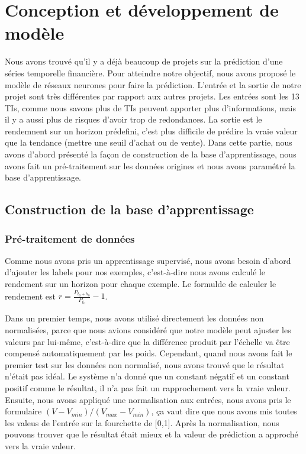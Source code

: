 

\section{Conception et développement de modèle}

Nous avons trouvé qu’il y a déjà beaucoup de projets sur la prédiction d’une séries temporelle financière. Pour atteindre notre objectif, nous avons proposé le modèle de réseaux neurones pour faire la prédiction. L’entrée et la sortie de notre projet sont très différentes par rapport aux autres projets. Les entrées sont les 13 TIs, comme nous savons plus de TIs peuvent apporter plus d’informations, mais il y a aussi plus de risques d’avoir trop de redondances. La sortie est le rendemnent sur un horizon prédefini, c’est plus difficile de prédire la vraie valeur que la tendance (mettre une seuil d’achat ou de vente). Dans cette partie, nous avons d'abord présenté la façon de construction de la base d'apprentissage, nous avons fait un pré-traitement sur les données origines et nous avons paramétré la base d'apprentissage. 

\subsection{Construction de la base d’apprentissage}

\subsubsection{Pré-traitement de données}

Comme nous avons pris un apprentissage supervisé, nous avons besoin d’abord d’ajouter les labels pour nos exemples, c’est-à-dire nous avons calculé le rendement sur un horizon pour chaque exemple. Le formulde de calculer le rendement est $ r = \frac{P_{t_{0}+h_{0}}}{P_{t_{0}}} - 1 $.

Dans un premier temps, nous avons utilisé directement les données non normalisées, parce que nous avions considéré que notre modèle peut ajuster les valeurs par lui-même, c'est-à-dire que la différence produit par l'échelle va être compensé automatiquement par les poids. Cependant, quand nous avons fait le premier test sur les données non normalisé, nous avons trouvé que le résultat n’était pas idéal. Le système n’a donné que un constant négatif et un constant positif comme le résultat, il n’a pas fait un rapprochement vers la vraie valeur. Ensuite, nous avons appliqué une normalisation aux entrées, nous avons pris le formulaire $(V-V_{min})/(V_{max}-V_{min})$, ça vaut dire que nous avons mis toutes les valeus de l’entrée sur la fourchette de [0,1]. Après la normalisation, nous pouvons trouver que le résultat était mieux et la valeur de prédiction a approché vers la vraie valeur.

